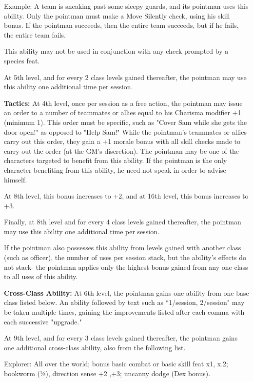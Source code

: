 Example: A team is sneaking past some sleepy guards, and its pointman uses this ability. Only the pointman must make a Move Silently check, using his skill bonus. If the pointman succeeds, then the entire team succeeds, but if he fails, the entire team fails.

This ability may not be used in conjunction with any check prompted by a species feat.

At 5th level, and for every 2 class levels gained thereafter, the pointman may use this ability one additional time per session.

\textbf{Tactics:} At 4th level, once per session as a free action, the pointman may issue an order to a number of teammates or allies equal to his Charisma modifier +1 (minimum 1). This order must be specific, such as "Cover Sam while she gets the door open!" as opposed to "Help Sam!" While the pointman's teammates or allies carry out this order, they gain a +1 morale bonus with all skill checks made to carry out the order (at the GM's discretion). The pointman may be one of the characters targeted to benefit from this ability. If the pointman is the only character benefiting from this ability, he need not speak in order to advise himself.

At 8th level, this bonus increases to +2, and at 16th level, this bonus increases to +3.

Finally, at 8th level and for every 4 class levels gained thereafter, the pointman may use this ability one additional time per session.

If the pointman also possesses this ability from levels gained with another class (such as officer), the number of uses per session stack, but the abiIity's effects do not stack- the pointman applies only the highest bonus gained from any one class to all uses of this ability.

\textbf{Cross-Class Ability:} At 6th level, the pointman gains one ability from one base class listed below. An ability followed by text such as “1/session, 2/session" may be taken multiple times, gaining the improvements listed after each comma with each successive "upgrade."

At 9th level, and for every 3 class levels gained thereafter, the pointman gains one additional cross-class ability, also from the following list.

Explorer: All over the world; bonus basic combat or basic skill feat x1, x.2; bookworm (½), direction sense +2 ,+3; uncanny dodge (Dex bonus).

